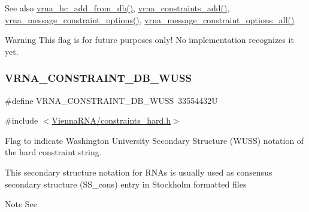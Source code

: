 \begin{DoxySeeAlso}{See also}
\mbox{\hyperlink{group__hard__constraints_ga5b4de3247b67358080c176b94591a8e6}{vrna\+\_\+hc\+\_\+add\+\_\+from\+\_\+db()}}, \mbox{\hyperlink{group__constraints_ga35a401f680969a556858a8dd5f1d07cc}{vrna\+\_\+constraints\+\_\+add()}}, \mbox{\hyperlink{group__constraints_gaa1f20b53bf09ac2e6b0dbb13f7d89670}{vrna\+\_\+message\+\_\+constraint\+\_\+options()}}, \mbox{\hyperlink{group__constraints_gaec7e13fa0465c2acc7a621d1aecb709f}{vrna\+\_\+message\+\_\+constraint\+\_\+options\+\_\+all()}}
\end{DoxySeeAlso}
\begin{DoxyWarning}{Warning}
This flag is for future purposes only! No implementation recognizes it yet. 
\end{DoxyWarning}
\mbox{\label{group__hard__constraints_ga10ce6bd2355945f3c8161b7a30a2c322}} 
\subsubsection{\texorpdfstring{V\+R\+N\+A\+\_\+\+C\+O\+N\+S\+T\+R\+A\+I\+N\+T\+\_\+\+D\+B\+\_\+\+W\+U\+SS}{VRNA\_CONSTRAINT\_DB\_WUSS}}
{\footnotesize\ttfamily \#define V\+R\+N\+A\+\_\+\+C\+O\+N\+S\+T\+R\+A\+I\+N\+T\+\_\+\+D\+B\+\_\+\+W\+U\+SS~33554432U}



{\ttfamily \#include $<$\mbox{\hyperlink{constraints__hard_8h}{Vienna\+R\+N\+A/constraints\+\_\+hard.\+h}}$>$}



Flag to indicate Washington University Secondary Structure (W\+U\+SS) notation of the hard constraint string. 

This secondary structure notation for R\+N\+As is usually used as consensus secondary structure (S\+S\+\_\+cons) entry in Stockholm formatted files

\begin{DoxyNote}{Note}
See 
\end{DoxyNote}
\mbox{\label{group__hard__constraints_ga1c3864bdc92147a4d93de2b1b4356177}} 
